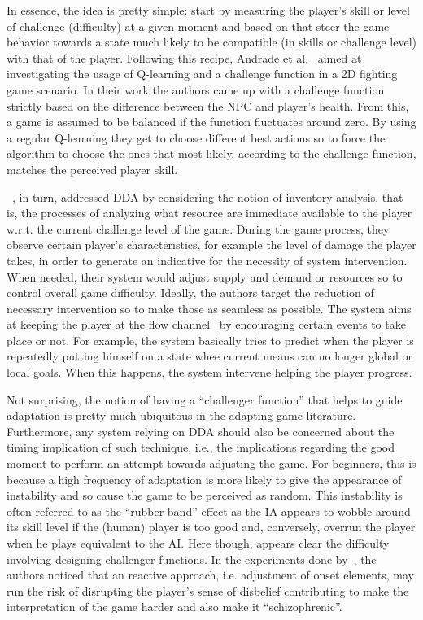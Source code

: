 In essence, the idea is pretty simple: start by measuring the player's skill or level of challenge (difficulty) at a given moment and based on that steer the game behavior towards a state much likely to be compatible (in skills or challenge level) with that of the player. Following this recipe, Andrade et al.~\cite{andrade_online_2004, andrade_extending_2005} aimed at investigating the usage of Q-learning and a challenge function in a 2D fighting game scenario. In their work the authors came up with a challenge function strictly based on the difference between the NPC and player's health. From this, a game is assumed to be balanced if the function fluctuates around zero. By using a regular Q-learning they get to choose different best actions so to force the algorithm to choose the ones that most likely, according to the challenge function, matches the perceived player skill. 

~\cite{hunicke_ai_2004}, in turn, addressed DDA by considering the notion of inventory analysis, that is, the processes of analyzing what resource are immediate available to the player w.r.t. the current challenge level of the game. During the game process, they observe certain player's characteristics, for example the level of damage the player takes, in order to generate an indicative for the necessity of system intervention. When needed, their system would adjust supply and demand or resources so to control overall game difficulty. Ideally, the authors target the reduction of necessary intervention so to make those as seamless as possible. The system aims at keeping the player at the flow channel~\cite{csikszentmihalyi_flow:_1991} by encouraging certain events to take place or not. For example, the system basically tries to predict when the player is repeatedly putting himself on a state whee current means can no longer global or local goals. When this happens, the system intervene helping the player progress.

Not surprising, the notion of having a ``challenger function'' that helps to guide adaptation is pretty much ubiquitous in the adapting game literature. Furthermore, any system relying on DDA should also be concerned about the timing implication of such technique, i.e., the implications regarding the good moment to perform an attempt towards adjusting the game. For beginners, this is because a high frequency of adaptation is more likely to give the appearance of instability and so cause the game to be perceived as random. This instability is often referred to as the ``rubber-band'' effect as the IA appears to wobble around its skill level if the (human) player is too good and, conversely, overrun the player when he plays equivalent to the AI. Here though, appears clear the difficulty involving designing challenger functions. In the experiments done by~\cite{hunicke_ai_2004}, the authors noticed that an reactive approach, i.e. adjustment of onset elements, may run the risk of disrupting the player's sense of disbelief contributing to make the interpretation of the game harder and also make it ``schizophrenic''.

